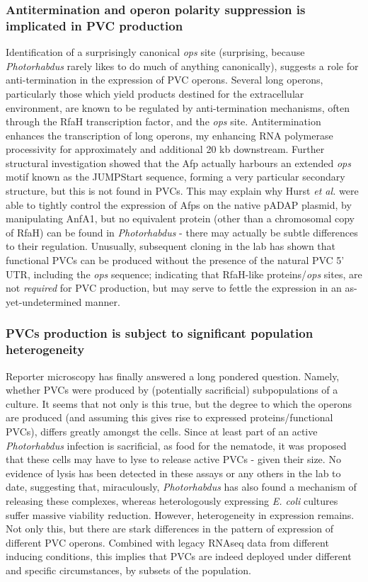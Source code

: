 \subsubsection{Antitermination and operon polarity suppression is implicated in PVC production}
Identification of a surprisingly canonical \emph{ops} site (surprising, because \emph{Photorhabdus} rarely likes to do much of anything canonically), suggests a role for anti-termination in the expression of PVC operons. Several long operons, particularly those which yield products destined for the extracellular environment, are known to be regulated by anti-termination mechanisms, often through the RfaH transcription factor, and the \emph{ops} site. Antitermination enhances the transcription of long operons, my enhancing RNA polymerase processivity for approximately and additional 20 kb downstream. Further structural investigation showed that the Afp actually harbours an extended \emph{ops} motif known as the JUMPStart sequence, forming a very particular secondary structure, but this is not found in PVCs. This may explain why Hurst \emph{et al.} were able to tightly control the expression of Afps on the native pADAP plasmid, by manipulating AnfA1, but no equivalent protein (other than a chromosomal copy of RfaH) can be found in \emph{Photorhabdus} - there may actually be subtle differences to their regulation. Unusually, subsequent cloning in the lab has shown that functional PVCs can be produced without the presence of the natural PVC 5' UTR, including the \emph{ops} sequence; indicating that RfaH-like proteins/\emph{ops} sites, are not \emph{required} for PVC production, but may serve to fettle the expression in an as-yet-undetermined manner.

\subsubsection{PVCs production is subject to significant population heterogeneity}
Reporter microscopy has finally answered a long pondered question. Namely, whether PVCs were produced by (potentially sacrificial) subpopulations of a culture. It seems that not only is this true, but the degree to which the operons are produced (and assuming this gives rise to expressed proteins/functional PVCs), differs greatly amongst the cells. Since at least part of an active \emph{Photorhabdus} infection is sacrificial, as food for the nematode, it was proposed that these cells may have to lyse to release active PVCs - given their size. No evidence of lysis has been detected in these assays or any others in the lab to date, suggesting that, miraculously, \emph{Photorhabdus} has also found a mechanism of releasing these complexes, whereas heterologously expressing \emph{E. coli} cultures suffer massive viability reduction. However, heterogeneity in expression remains. Not only this, but there are stark differences in the pattern of expression of different PVC operons. Combined with legacy RNAseq data from different inducing conditions, this implies that PVCs are indeed deployed under different and specific circumstances, by subsets of the population.

